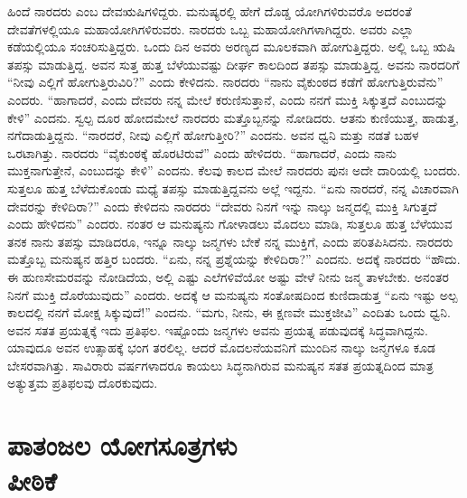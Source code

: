 ಹಿಂದೆ ನಾರದರು ಎಂಬ ದೇವಋಷಿಗಳಿದ್ದರು. ಮನುಷ್ಯರಲ್ಲಿ ಹೇಗೆ ದೊಡ್ಡ ಯೋಗಿಗಳಿರುವರೊ ಅದರಂತೆ ದೇವತೆಗಳಲ್ಲಿಯೂ ಮಹಾಯೋಗಿಗಳಿರುವರು. ನಾರದರು ಒಬ್ಬ ಮಹಾಯೋಗಿಗಳಾಗಿದ್ದರು. ಅವರು ಎಲ್ಲಾ ಕಡೆಯಲ್ಲಿಯೂ ಸಂಚರಿಸುತ್ತಿದ್ದರು. ಒಂದು ದಿನ ಅವರು ಅರಣ್ಯದ ಮೂಲಕವಾಗಿ ಹೋಗುತ್ತಿದ್ದರು. ಅಲ್ಲಿ ಒಬ್ಬ ಋಷಿ ತಪಸ್ಸು ಮಾಡುತ್ತಿದ್ದ. ಅವನ ಸುತ್ತ ಹುತ್ತ ಬೆಳೆಯುವಷ್ಟು ದೀರ್ಘ ಕಾಲದಿಂದ ತಪಸ್ಸು ಮಾಡುತ್ತಿದ್ದ. ಅವನು ನಾರದರಿಗೆ “ನೀವು ಎಲ್ಲಿಗೆ ಹೋಗುತ್ತಿರುವಿರಿ?” ಎಂದು ಕೇಳಿದನು. ನಾರದರು “ನಾನು ವೈಕುಂಠದ ಕಡೆಗೆ ಹೋಗುತ್ತಿರುವೆನು” ಎಂದರು. “ಹಾಗಾದರೆ, ಎಂದು ದೇವರು ನನ್ನ ಮೇಲೆ ಕರುಣಿಸುತ್ತಾನೆ, ಎಂದು ನನಗೆ ಮುಕ್ತಿ ಸಿಕ್ಕುತ್ತದೆ ಎಂಬುದನ್ನು ಕೇಳಿ” ಎಂದನು. ಸ್ವಲ್ಪ ದೂರ ಹೋದಮೇಲೆ ನಾರದರು ಮತ್ತೊಬ್ಬನನ್ನು ನೋಡಿದರು. ಆತನು ಕುಣಿಯುತ್ತ, ಹಾಡುತ್ತ, ನಗೆದಾಡುತ್ತಿದ್ದನು. “ನಾರದರೆ, ನೀವು ಎಲ್ಲಿಗೆ ಹೋಗುತ್ತೀರಿ?” ಎಂದನು. ಅವನ ಧ್ವನಿ ಮತ್ತು ನಡತೆ ಬಹಳ ಒರಟಾಗಿತ್ತು. ನಾರದರು “ವೈಕುಂಠಕ್ಕೆ ಹೊರಟಿರುವೆ” ಎಂದು ಹೇಳಿದರು. “ಹಾಗಾದರೆ, ಎಂದು ನಾನು ಮುಕ್ತನಾಗುತ್ತೇನೆ, ಎಂಬುದನ್ನು ಕೇಳಿ” ಎಂದನು. ಕೆಲವು ಕಾಲದ ಮೇಲೆ ನಾರದರು ಪುನಃ ಅದೇ ದಾರಿಯಲ್ಲಿ ಬಂದರು. ಸುತ್ತಲೂ ಹುತ್ತ ಬೆಳೆದುಕೊಂಡು ಮಧ್ಯೆ ತಪಸ್ಸು ಮಾಡುತ್ತಿದ್ದವನು ಅಲ್ಲೆ ಇದ್ದನು. “ಏನು ನಾರದರೆ, ನನ್ನ ವಿಚಾರವಾಗಿ ದೇವರನ್ನು ಕೇಳಿದಿರಾ?” ಎಂದು ಕೇಳಿದನು ನಾರದರು “ದೇವರು ನಿನಗೆ ಇನ್ನು ನಾಲ್ಕು ಜನ್ಮದಲ್ಲಿ ಮುಕ್ತಿ ಸಿಗುತ್ತದೆ ಎಂದು ಹೇಳಿದನು” ಎಂದರು. ನಂತರ ಆ ಮನುಷ್ಯನು ಗೋಳಾಡಲು ಮೊದಲು ಮಾಡಿ, ಸುತ್ತಲೂ ಹುತ್ತ ಬೆಳೆಯುವ ತನಕ ನಾನು ತಪಸ್ಸು ಮಾಡಿದರೂ, ಇನ್ನೂ ನಾಲ್ಕು ಜನ್ಮಗಳು ಬೇಕೆ ನನ್ನ ಮುಕ್ತಿಗೆ, ಎಂದು ಪರಿತಪಿಸಿದನು. ನಾರದರು ಮತ್ತೊಬ್ಬ ಮನುಷ್ಯನ ಹತ್ತಿರ ಬಂದರು. “ಏನು, ನನ್ನ ಪ್ರಶ್ನೆಯನ್ನು ಕೇಳಿದಿರಾ?” ಎಂದನು. ಅದಕ್ಕೆ ನಾರದರು “ಹೌದು. ಈ ಹುಣಸೇಮರವನ್ನು ನೋಡಿದೆಯ, ಅಲ್ಲಿ ಎಷ್ಟು ಎಲೆಗಳಿವೆಯೋ ಅಷ್ಟು ವೇಳೆ ನೀನು ಜನ್ಮ ತಾಳಬೇಕು. ಅನಂತರ ನಿನಗೆ ಮುಕ್ತಿ ದೊರೆಯುವುದು” ಎಂದರು. ಅದಕ್ಕೆ ಆ ಮನುಷ್ಯನು ಸಂತೋಷದಿಂದ ಕುಣಿದಾಡುತ್ತ “ಏನು ಇಷ್ಟು ಅಲ್ಪ ಕಾಲದಲ್ಲಿ ನನಗೆ ಮೋಕ್ಷ ಸಿಕ್ಕುವುದೆ!” ಎಂದನು. “ಮಗು, ನೀನು, ಈ ಕ್ಷಣವೇ ಮುಕ್ತಜೀವಿ” ಎಂದಿತು ಒಂದು ಧ್ವನಿ. ಅವನ ಸತತ ಪ್ರಯತ್ನಕ್ಕೆ ಇದು ಪ್ರತಿಫಲ. ಇಷ್ಟೊಂದು ಜನ್ಮಗಳು ಅವನು ಪ್ರಯತ್ನ ಪಡುವುದಕ್ಕೆ ಸಿದ್ಧವಾಗಿದ್ದನು. ಯಾವುದೂ ಅವನ ಉತ್ಸಾಹಕ್ಕೆ ಭಂಗ ತರಲಿಲ್ಲ. ಆದರೆ ಮೊದಲನೆಯವನಿಗೆ ಮುಂದಿನ ನಾಲ್ಕು ಜನ್ಮಗಳೂ ಕೂಡ ಬೇಸರವಾಗಿತ್ತು. ಸಾವಿರಾರು ವರ್ಷಗಳಾದರೂ ಕಾಯಲು ಸಿದ್ಧನಾಗಿರುವ ಮನುಷ್ಯನ ಸತತ ಪ್ರಯತ್ನದಿಂದ ಮಾತ್ರ ಅತ್ಯುತ್ತಮ ಪ್ರತಿಫಲವು ದೊರಕುವುದು.

\chapter{ಪಾತಂಜಲ ಯೋಗಸೂತ್ರಗಳು\\ಪೀಠಿಕೆ}

